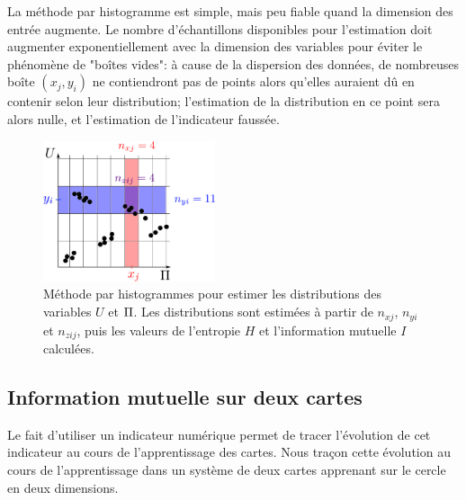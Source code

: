 La méthode par histogramme est simple, mais peu fiable quand la dimension des entrée augmente.
Le nombre d'échantillons disponibles pour l'estimation doit augmenter exponentiellement avec la dimension des variables pour éviter le phénomène de "boîtes vides": à cause de la dispersion des données, de nombreuses boîte $(x_j,y_i)$ ne contiendront pas de points alors qu'elles auraient dû en contenir selon leur distribution; l'estimation de la distribution en ce point sera alors nulle, et l'estimation de l'indicateur faussée.
\begin{figure}
\centering
\includegraphics[width=0.45\textwidth]{boxes}
\caption{Méthode par histogrammes pour estimer les distributions des variables $U$ et $\Pi$. Les distributions sont estimées à partir de $n_{xj}$, $n_{yi}$ et $n_{zij}$, puis les valeurs de l'entropie $H$ et l'information mutuelle $I$ calculées.}
\label{fig:binning} 

\end{figure}


\subsection{Information mutuelle sur deux cartes}

Le fait d'utiliser un indicateur numérique permet de tracer l'évolution de cet indicateur au cours de l'apprentissage des cartes. Nous traçon cette évolution au cours de l'apprentissage dans un système de deux cartes apprenant sur le cercle en deux dimensions.

